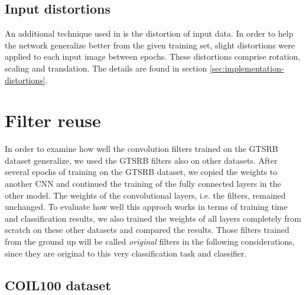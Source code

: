 \documentclass[11pt, a4paper]{article}
\begin{document}
\subsection{Input distortions}
An additional technique used in \cite{multi-column-neural-network-gtsrb} is the distortion of input data. In order to help the network generalize better from the given training set, slight distortions were applied to each input image between epochs. These distortions comprise rotation, scaling and translation. The details are found in section \ref{sec:implementation-distortions}.


\section{Filter reuse}

In order to examine how well the convolution filters trained on the GTSRB dataset generalize, we used the GTSRB filters also on other datasets. After several epochs of training on the GTSRB dataset, we copied the weights to another CNN and continued the training of the fully connected layers in the other model. The weights of the convolutional layers, i.e. the filters, remained unchanged. To evaluate how well this approch works in terms of training time and classification results, we also trained the weights of all layers completely from scratch on these other datasets and compared the results. Those filters trained from the ground up will be called \textit{original} filters in the following considerations, since they are original to this very classification task and classifier.

\subsection{COIL100 dataset}
\end{document}
